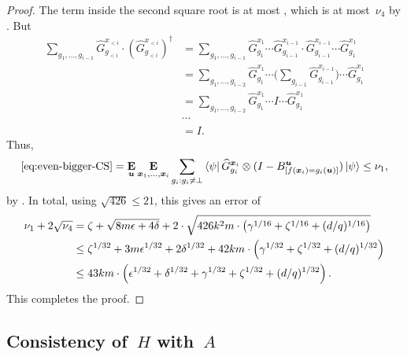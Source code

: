 \begin{proof}
The term inside the second square root is at most ,
which is at most~$\nu_4$ by .
But
\begin{align*}
\sum_{g_1, \ldots, g_{i-1}} \widehat{G}^{x_{<i}}_{g_{<i}} \cdot (\widehat{G}^{x_{<i}}_{g_{<i}})^\dagger
&= \sum_{g_1, \ldots, g_{i-1}} \widehat{G}^{x_1}_{g_1} \cdots \widehat{G}^{x_{i-1}}_{g_{i-1}} \cdot \widehat{G}^{x_{i-1}}_{g_{i-1}}  \cdots \widehat{G}^{x_{1}}_{g_{1}}\\
&= \sum_{g_1, \ldots, g_{i-2}} \widehat{G}^{x_1}_{g_1} \cdots \Big(\sum_{g_{i-1}} \widehat{G}^{x_{i-1}}_{g_{i-1}} \Big)  \cdots \widehat{G}^{x_{1}}_{g_{1}}\\
&= \sum_{g_1, \ldots, g_{i-2}} \widehat{G}^{x_1}_{g_1} \cdots I  \cdots \widehat{G}^{x_{1}}_{g_{1}}\\
& \cdots\\
& = I.
\end{align*}
Thus,
\begin{equation*}
\eqref{eq:even-bigger-CS}
= 
\mathop{\bf E\/}_{\boldsymbol{u}}  \mathop{\bf E\/}_{{\boldsymbol{x}}_1, \dots, {\boldsymbol{x}}_i} \sum_{g_i: g_i \neq \bot} \bra{\psi}\widehat{G}^{{\boldsymbol{x}}_i}_{g_i} \otimes (I - B^{\boldsymbol{u}}_{[f({\boldsymbol{x}}_i) =
    g_i(\boldsymbol{u})]}) \ket{\psi} \leq \nu_1,
\end{equation*}
by .
In total, using $\sqrt{426} \leq 21$, this gives an error of
\begin{align*}
\nu_1 + 2 \sqrt{\nu_4}
& = \zeta + \sqrt{8m\epsilon + 4\delta} + 2\cdot \sqrt{426 k^2 m \cdot \left(\gamma^{1/16} + \zeta^{1/16} +  (d/q)^{1/16}\right)}\\
& \leq \zeta^{1/32} + 3m \epsilon^{1/32} + 2 \delta^{1/32} + 42 km \cdot \left(\gamma^{1/32} + \zeta^{1/32} + (d/q)^{1/32}\right)\\
& \leq 43 km \cdot \left(\epsilon^{1/32} + \delta^{1/32} +\gamma^{1/32} + \zeta^{1/32} +  (d/q)^{1/32}\right).
\end{align*}
This completes the proof.
\end{proof}

\subsection{Consistency of~$H$ with~$A$}
\label{sec:consistency-of-h-with-a}

